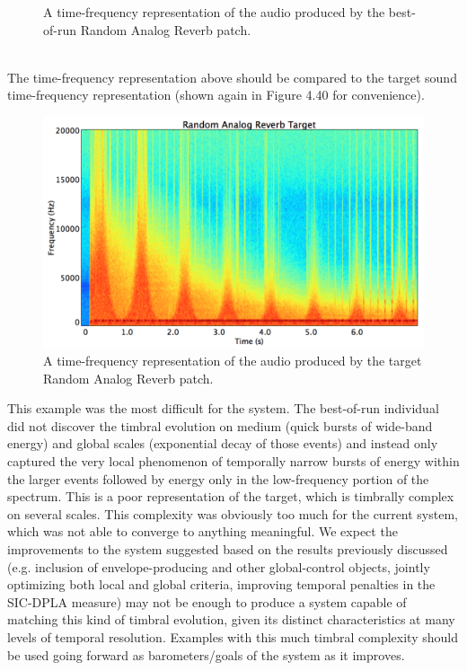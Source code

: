 \documentclass[a4paper,12pt]{report} 	%
\numberwithin{figure}{chapter}
\numberwithin{table}{chapter}
\numberwithin{equation}{chapter}
\begin{document}
\begin{flushleft}
\begin{figure}[h!]
\begin{center}
\caption[Best-of-Run Random Analog Reverb Time-Frequency Representation]{A time-frequency representation of the audio produced by the best-of-run Random Analog Reverb patch.}
\end{center}
\end{figure}
\\
The time-frequency representation above should be compared to the target sound time-frequency representation (shown again in Figure 4.40 for convenience).
\begin{figure}[h!]
\begin{center}
\includegraphics[scale=0.35,width=\linewidth]{RandomAnalogReverbTargetSTFT}
\caption[Target Random Analog Reverb Time-Frequency Representation]{A time-frequency representation of the audio produced by the target Random Analog Reverb patch.}
\end{center}
\end{figure}
This example was the most difficult for the system. The best-of-run individual did not discover the timbral evolution on medium (quick bursts of wide-band energy) and global scales (exponential decay of those events) and instead only captured the very local phenomenon of temporally narrow bursts of energy within the larger events followed by energy only in the low-frequency portion of the spectrum. This is a poor representation of the target, which is timbrally complex on several scales. This complexity was obviously too much for the current system, which was not able to converge to anything meaningful. We expect the improvements to the system suggested based on the results previously discussed (e.g. inclusion of envelope-producing and other global-control objects, jointly optimizing both local and global criteria, improving temporal penalties in the SIC-DPLA measure) may not be enough to produce a system capable of matching this kind of timbral evolution, given its distinct characteristics at many levels of temporal resolution. Examples with this much timbral complexity should be used going forward as barometers/goals of the system as it improves.


\end{flushleft}
\end{document}
